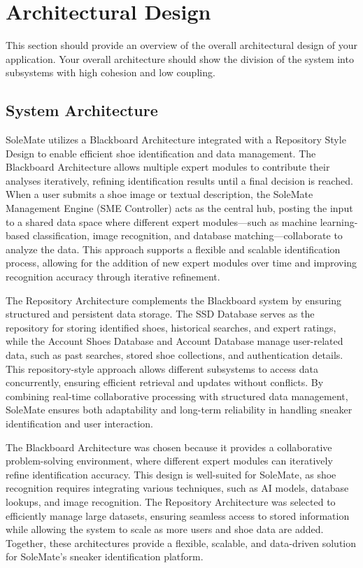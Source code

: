 \documentclass[]{article}
\begin{document}


\section{Architectural Design}
\label{sec:architectural_design}
This section should provide an overview of the overall architectural design of your application. Your overall architecture should show the division of the system into subsystems with high cohesion and low coupling.

\subsection{System Architecture}
\label{sub:system_architecture}
SoleMate utilizes a Blackboard Architecture integrated with a Repository Style Design to enable efficient shoe identification and data management. The Blackboard Architecture allows multiple expert modules to contribute their analyses iteratively, refining identification results until a final decision is reached. When a user submits a shoe image or textual description, the SoleMate Management Engine (SME Controller) acts as the central hub, posting the input to a shared data space where different expert modules—such as machine learning-based classification, image recognition, and database matching—collaborate to analyze the data. This approach supports a flexible and scalable identification process, allowing for the addition of new expert modules over time and improving recognition accuracy through iterative refinement. \par
The Repository Architecture complements the Blackboard system by ensuring structured and persistent data storage. The SSD Database serves as the repository for storing identified shoes, historical searches, and expert ratings, while the Account Shoes Database and Account Database manage user-related data, such as past searches, stored shoe collections, and authentication details. This repository-style approach allows different subsystems to access data concurrently, ensuring efficient retrieval and updates without conflicts. By combining real-time collaborative processing with structured data management, SoleMate ensures both adaptability and long-term reliability in handling sneaker identification and user interaction. \par
The Blackboard Architecture was chosen because it provides a collaborative problem-solving environment, where different expert modules can iteratively refine identification accuracy. This design is well-suited for SoleMate, as shoe recognition requires integrating various techniques, such as AI models, database lookups, and image recognition. The Repository Architecture was selected to efficiently manage large datasets, ensuring seamless access to stored information while allowing the system to scale as more users and shoe data are added. Together, these architectures provide a flexible, scalable, and data-driven solution for SoleMate’s sneaker identification platform. \par
\end{document}
